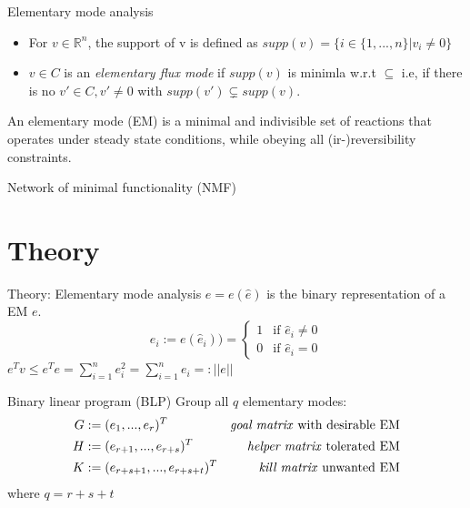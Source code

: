 \documentclass{beamer}
\begin{document}
\begin{frame}{Elementary mode analysis}
    \begin{itemize}
        \item For $v \in \mathbb{R}^n$, the support of v is defined as 
        $supp(v) = \{i \in \{1, ..., n \} | v_i \neq 0  \}$
    
        \item $v \in C$ is an \emph{elementary flux mode} if $supp(v)$
        is minimla w.r.t $\subseteq$
        i.e, if there is no $v' \in C, v' \neq 0$ with 
        $supp(v') \subsetneq supp(v)$.
    \end{itemize}
    
    
    \begin{definition}
        An elementary mode (EM) is a minimal and indivisible set 
        of reactions that operates under steady state conditions, 
        while obeying all (ir-)reversibility constraints.
    \end{definition}
    
\end{frame}

\begin{frame}{Network of minimal functionality (NMF)}
    
\end{frame}


\section{Theory}
\begin{frame}{Theory: Elementary mode analysis}
    $e = e(\hat{e}) $ is the binary representation of a EM $e$.
    \begin{equation}
        e_{i} := e(\hat{e}_{i})) = 
        \begin{cases}
            1 & \text{if }  \hat{e}_{i} \neq 0 \\
            0 & \text{if }  \hat{e}_{i} = 0 
        \end{cases}
    \end{equation}
    $ e^{T}v \leq e^{T}e = \sum_{i=1}^{n} e_{i}^{2} = \sum_{i=1}^{n} e_{i} =: ||e||$

\end{frame}

\begin{frame}{Binary linear program (BLP)}
    Group all $q$ elementary modes:
    \begin{align*}
        G &:= (e_{1}, ..., e_{r})^{T}            &\text{\emph{goal matrix} with desirable EM}   &\\
        H &:= (e_{r+1}, ..., e_{r+s})^{T}        &\text{\emph{helper matrix} tolerated EM}      &\\
        K &:= (e_{r+s+1}, ..., e_{r+s+t})^{T}    &\text{\emph{kill matrix} unwanted EM}         &\\
    \end{align*}
where $q = r+s+t$
\end{frame}
\end{document}

